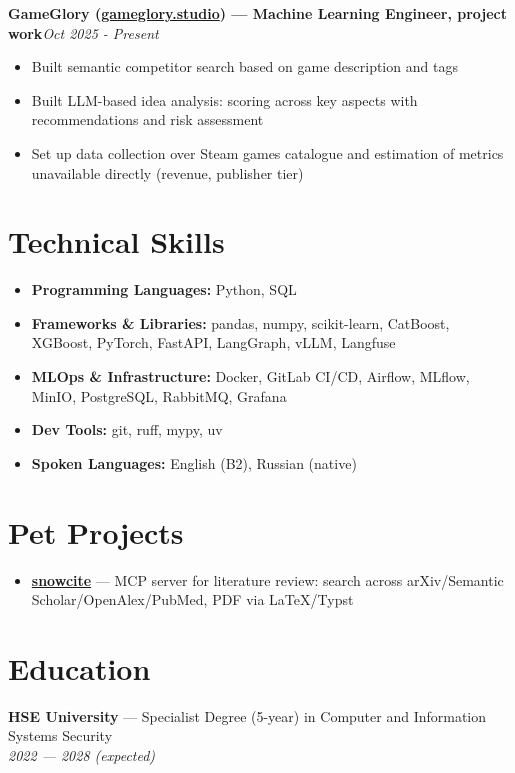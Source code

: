 \documentclass[a4paper,11pt]{article}
\begin{document}
\textbf{GameGlory (\href{https://gameglory.studio/}{gameglory.studio}) --- Machine Learning Engineer, project work}\hfill \textit{Oct 2025 - Present}

\begin{itemize}
  \item Built semantic competitor search based on game description and tags
  \item Built LLM-based idea analysis: scoring across key aspects with recommendations and risk assessment
  \item Set up data collection over Steam games catalogue and estimation of metrics unavailable directly (revenue, publisher tier)
\end{itemize}

\section*{Technical Skills}
\begin{itemize}
  \item \textbf{Programming Languages:} Python, SQL
  \item \textbf{Frameworks \& Libraries:} pandas, numpy, scikit-learn, CatBoost, XGBoost, PyTorch, FastAPI, LangGraph, vLLM, Langfuse
  \item \textbf{MLOps \& Infrastructure:} Docker, GitLab CI/CD, Airflow, MLflow, MinIO, PostgreSQL, RabbitMQ, Grafana
  \item \textbf{Dev Tools:} git, ruff, mypy, uv
  \item \textbf{Spoken Languages:} English (B2), Russian (native)
\end{itemize}

\section*{Pet Projects}
\begin{itemize}
  \item \href{https://github.com/notaskynet/snowcite}{\textbf{snowcite}} --- MCP server for literature review: search across arXiv/Semantic Scholar/OpenAlex/PubMed, PDF via LaTeX/Typst
\end{itemize}

\section*{Education}
\textbf{HSE University} --- Specialist Degree (5-year) in Computer and Information Systems Security\\
\textit{2022 --- 2028 (expected)}
\end{document}
